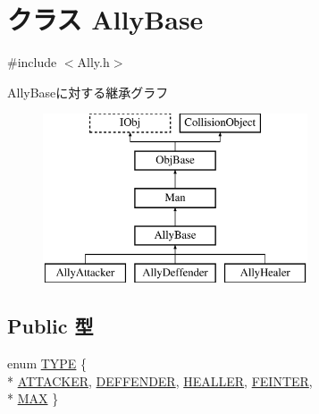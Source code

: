 \hypertarget{class_ally_base}{\section{クラス Ally\-Base}
\label{class_ally_base}
}


{\ttfamily \#include $<$Ally.\-h$>$}

Ally\-Baseに対する継承グラフ\begin{figure}[H]
\begin{center}
\leavevmode
\includegraphics[height=5.000000cm]{dd/d54/class_ally_base}
\end{center}
\end{figure}
\subsection*{Public 型}
\begin{DoxyCompactItemize}
\item 
enum \hyperlink{class_ally_base_a415be0ac5999cacff3c36db435115e91}{T\-Y\-P\-E} \{ \\*
\hyperlink{class_ally_base_a415be0ac5999cacff3c36db435115e91a570b1a3bd521dc38c4ee18ac9e64cb17}{A\-T\-T\-A\-C\-K\-E\-R}, 
\hyperlink{class_ally_base_a415be0ac5999cacff3c36db435115e91ac3e02201ee59a640522f3a01d307cc9f}{D\-E\-F\-F\-E\-N\-D\-E\-R}, 
\hyperlink{class_ally_base_a415be0ac5999cacff3c36db435115e91ad206186da211264935f86a0f6a890145}{H\-E\-A\-L\-L\-E\-R}, 
\hyperlink{class_ally_base_a415be0ac5999cacff3c36db435115e91af47de2a600a689cc5c0275428a148e60}{F\-E\-I\-N\-T\-E\-R}, 
\\*
\hyperlink{class_ally_base_a415be0ac5999cacff3c36db435115e91a2c4893a235c95170de62123fc3817485}{M\-A\-X}
 \}
\end{DoxyCompactItemize}
